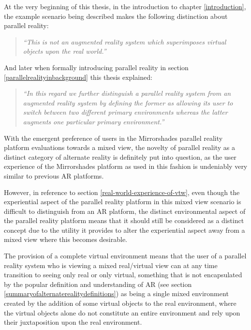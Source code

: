 At the very beginning of this thesis, in the introduction to chapter \ref{introduction}, the example scenario being described makes the following distinction about parallel reality:

\begin{quote}
	\textit{``This is not an augmented reality system which superimposes virtual objects upon the real world.''}
\end{quote}

And later when formally introducing parallel reality in section \ref{parallelrealityinbackground} this thesis explained:

\begin{quote}
	\textit{``In this regard we further distinguish a parallel reality system from an augmented reality system by defining the former as allowing its user to switch between two different primary environments whereas the latter augments one particular primary environment.''}
\end{quote}

With the emergent preference of users in the Mirrorshades parallel reality platform evaluations towards a mixed view, the novelty of parallel reality as a distinct category of alternate reality is definitely put into question, as the user experience of the Mirrorshades platform as used in this fashion is undeniably very similar to previous AR platforms.

However, in reference to section \ref{real-world-experience-of-vtw}, even though the experiential aspect of the parallel reality platform in this mixed view scenario is difficult to distinguish from an AR platform, the distinct environmental aspect of the parallel reality platform means that it should still be considered as a distinct concept due to the utility it provides to alter the experiential aspect away from a mixed view where this becomes desirable.

The provision of a complete virtual environment means that the user of a parallel reality system who is viewing a mixed real/virtual view can at any time transition to seeing only real or only virtual, something that is not encapsulated by the popular definition and understanding of AR (see section \ref{summaryofalternaterealitydefinitions}) as being a single mixed environment created by the addition of some virtual objects to the real environment, where the virtual objects alone do not constitute an entire environment and rely upon their juxtaposition upon the real environment.

